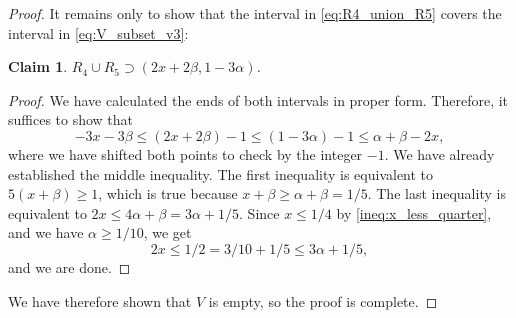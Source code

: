 \documentclass{article}
\newtheorem{claim}{Claim}
\def\IntervalProjectEnd{\end{document}}
\begin{document}
\begin{proof}
        It remains only to show that the interval in \eqref{eq:R4_union_R5} covers the interval in \eqref{eq:V_subset_v3}:

        \begin{claim}
            $R_4 \cup R_5 \supset (2x + 2\beta, 1 - 3\alpha)$.
        \end{claim}
        \begin{proof}
            We have calculated the ends of both intervals in proper form.
            Therefore, it suffices to show that
            \[
                -3x - 3 \beta \leq (2x + 2\beta) - 1 \leq (1 - 3\alpha) - 1\leq \alpha + \beta - 2x,         
            \]
            where we have shifted both points to check by the integer $-1$.
            We have already established the middle inequality.
            The first inequality is equivalent to ${5(x+\beta) \geq 1}$, which is true because ${x + \beta \geq \alpha + \beta = 1/5}$.
            The last inequality is equivalent to $2x \leq 4\alpha + \beta = 3 \alpha + 1/5$.
            Since $x \leq 1/4$ by \eqref{ineq:x_less_quarter}, and we have $\alpha \geq 1/10$, we get
            \[
                2x \leq 1/2 = 3/10 + 1/5 \leq 3\alpha + 1/5,
            \]
            and we are done.
        \end{proof}

        We have therefore shown that $V$ is empty, so the proof is complete.

    \end{proof}
        

\IntervalProjectEnd
\end{document}
